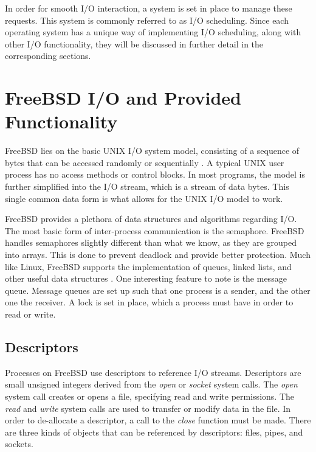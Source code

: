 \documentclass[10pt, onecolumn]{IEEEtran}
\begin{document}
        In order for smooth I/O interaction, a system is set in place to manage these requests. This system is commonly referred to as I/O scheduling. Since each operating system has a unique way of implementing I/O scheduling, along with other I/O functionality, they will be discussed in further detail in the corresponding sections.
    
    
    \section{FreeBSD I/O and Provided Functionality}
        FreeBSD lies on the basic UNIX I/O system model, consisting of a sequence of bytes that can be accessed randomly or sequentially \cite{designO}. A typical UNIX user process has no access methods or control blocks. In most programs, the model is further simplified into the I/O stream, which is a stream of data bytes. This single common data form is what allows for the UNIX I/O model to work.
        
        \vspace{1.5mm}
        
        FreeBSD provides a plethora of data structures and algorithms regarding I/O. The most basic form of inter-process communication is the semaphore. FreeBSD handles semaphores slightly different than what we know, as they are grouped into arrays. This is done to prevent deadlock and provide better protection. Much like Linux, FreeBSD supports the implementation of queues, linked lists, and other useful data structures \cite{fkp}. One interesting feature to note is the message queue. Message queues are set up such that one process is a sender, and the other one the receiver. A lock is set in place, which a process must have in order to read or write.
        
        \subsection{Descriptors}
            Processes on FreeBSD use descriptors to reference I/O streams. Descriptors are small unsigned integers derived from the \textit{open} or \textit{socket} system calls. The \textit{open} system call creates or opens a file, specifying read and write permissions. The \textit{read} and \textit{write} system calls are used to transfer or modify data in the file. In order to de-allocate a descriptor, a call to the \textit{close} function must be made. There are three kinds of objects that can be referenced by descriptors: files, pipes, and sockets.
            
\end{document}
